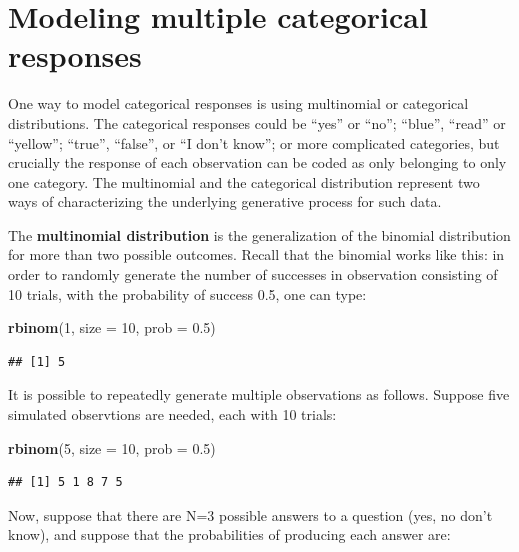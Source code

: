 \documentclass[12pt,]{krantz}
\newenvironment{Shaded}{\begin{snugshade}}{\end{snugshade}}
\newcommand{\KeywordTok}[1]{\textcolor[rgb]{0.13,0.29,0.53}{\textbf{#1}}}
\newcommand{\DataTypeTok}[1]{\textcolor[rgb]{0.13,0.29,0.53}{#1}}
\newcommand{\DecValTok}[1]{\textcolor[rgb]{0.00,0.00,0.81}{#1}}
\newcommand{\FloatTok}[1]{\textcolor[rgb]{0.00,0.00,0.81}{#1}}
\newcommand{\NormalTok}[1]{#1}
\theoremstyle{definition}
\theoremstyle{definition}
\theoremstyle{definition}
\theoremstyle{remark}
\begin{document}
\section{Modeling multiple categorical
responses}\label{modeling-multiple-categorical-responses}

One way to model categorical responses is using multinomial or
categorical distributions. The categorical responses could be ``yes'' or
``no''; ``blue'', ``read'' or ``yellow''; ``true'', ``false'', or ``I
don't know''; or more complicated categories, but crucially the response
of each observation can be coded as only belonging to only one category.
The multinomial and the categorical distribution represent two ways of
characterizing the underlying generative process for such data.

The \textbf{multinomial distribution} is the generalization of the
binomial distribution for more than two possible outcomes. Recall that
the binomial works like this: in order to randomly generate the number
of successes in observation consisting of 10 trials, with the
probability of success 0.5, one can type:

\begin{Shaded}
\begin{Highlighting}[]
\KeywordTok{rbinom}\NormalTok{(}\DecValTok{1}\NormalTok{, }\DataTypeTok{size =} \DecValTok{10}\NormalTok{, }\DataTypeTok{prob =} \FloatTok{0.5}\NormalTok{)}
\end{Highlighting}
\end{Shaded}

\begin{verbatim}
## [1] 5
\end{verbatim}

It is possible to repeatedly generate multiple observations as follows.
Suppose five simulated observtions are needed, each with 10 trials:

\begin{Shaded}
\begin{Highlighting}[]
\KeywordTok{rbinom}\NormalTok{(}\DecValTok{5}\NormalTok{, }\DataTypeTok{size =} \DecValTok{10}\NormalTok{, }\DataTypeTok{prob =} \FloatTok{0.5}\NormalTok{)}
\end{Highlighting}
\end{Shaded}

\begin{verbatim}
## [1] 5 1 8 7 5
\end{verbatim}

Now, suppose that there are N=3 possible answers to a question (yes, no
don't know), and suppose that the probabilities of producing each answer
are:
\end{document}
